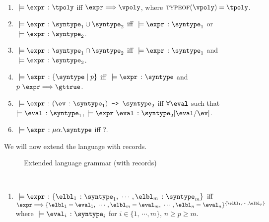 \begin{definition}
  \label{def_typingRulesExt}
  \ \par
  \begin{enumerate}
      \item $\ \models \hastype{\expr}{\tpoly}$ iff $\expr \bigstep \vpoly$, where $\textsc{typeof}(\vpoly) = \tpoly$.
      \item $\ \models \hastype{\expr}{\mkunion{\syntype_1}{\syntype_2}}$ iff $\ \models \hastype{\expr}{\syntype_1}$ or $\ \models \hastype{\expr}{\syntype_2}$.
      \item $\ \models \hastype{\expr}{\mkintersect{\syntype_1}{\syntype_2}}$ iff $\ \models \hastype{\expr}{\syntype_1}$ and $\ \models \hastype{\expr}{\syntype_2}$.
      \item $\ \models \hastype{\expr}{\mktset{\syntype}{p}}$ iff $\ \models \hastype{\expr}{\syntype}$ and $p \ \expr \Longrightarrow \gttrue$.
      \item $\ \models \hastype{\expr}{\mkdfun{\ev}{\syntype_1}{\syntype_2}}$ iff $\forall{\eval}$ such that $\models \hastype{\eval}{\syntype_1}$, $\models \hastype{\expr\ \eval}{\substitute{\syntype_2}{\eval}{\ev}}$.
      \item $\ \models \hastype{\expr}{\mkmiu{\alpha}{\syntype}}$ iff ?.
  \end{enumerate}
\end{definition}

We will now extend the language with records.


\begin{figure}[hbt!]%
  \begin{grammar}
            \grule[values]{\eval}{
              \cdots
              \gor \{\overline{\elbl = \eval}\}^{\{\overline{\elbl}\}}
            }
            \grule[types]{\syntype}{
              \cdots
              \gor \{\overline{\hastype{\elbl}{\syntype}}\} 
          }
        \end{grammar}
    \caption{Extended language grammar (with records)}
    \label{rec_Grammar}
\end{figure}

\begin{definition}
  \label{def_typingRec}
  \ \par
  \begin{enumerate}
      \item $\ \models \hastype{\expr}{\{\hastype{\elbl_1}{\syntype_1},\ \cdots, \hastype{\elbl_m}{\syntype_m}\}}$ iff $\expr \bigstep \{\elbl_1 = \eval_1,\ \cdots, \elbl_m = \eval_m,\ \cdots, \elbl_n = \eval_n\}^{\{\elbl_1, \cdots, \elbl_p\}}$ where $\ \models \hastype{\eval_i}{\syntype_i}$ for $i \in \{1,\ \cdots, m\}$, $n \geq p \geq m$.
  \end{enumerate}
\end{definition}

